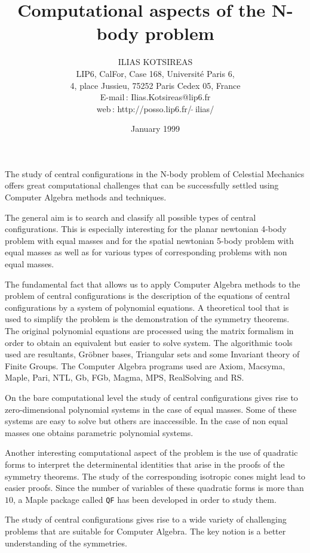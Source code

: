 
\textheight 24cm



\title{Computational aspects of the N-body problem }
\author{ 
ILIAS KOTSIREAS 
\\LIP6, CalFor, Case 168, Universit\'e Paris 6, 
\\4, place Jussieu, 75252 Paris Cedex 05, France
\\E-mail\,: Ilias.Kotsireas@lip6.fr
\\web\,: http://posso.lip6.fr/$ \ \tilde{\left. \right.} \ $ilias/}
\date{January 1999}
\maketitle

The study of central configurations 
in the N-body problem of Celestial Mechanics
offers great computational challenges
that can be successfully settled using 
Computer Algebra methods and techniques.  \par
The general aim is to search and classify
all possible types of central configurations.
This is especially interesting 
for the planar newtonian 4-body problem with equal masses and
for the spatial newtonian 5-body problem with equal masses
as well as for various types of corresponding problems 
with non equal masses. \par  
The fundamental fact that allows us to apply Computer Algebra methods to
the problem of central configurations is the description of
the equations of central configurations by a system of polynomial 
equations. A theoretical tool that is used to simplify 
the problem is the demonstration of the symmetry theorems.
The original polynomial equations are processed using the
matrix formalism in order to obtain an equivalent but easier
to solve system. The algorithmic tools used are resultants, Gr\"obner bases,
Triangular sets and some Invariant theory of Finite Groups.
The Computer Algebra programs used are Axiom, Macsyma, Maple, Pari,
NTL, Gb, FGb, Magma, MPS, RealSolving and RS. \par
On the bare computational level the study of central configurations
gives rise to zero-dimensional polynomial systems in the case of equal masses.
Some of these systems are easy to solve but others are inaccessible.
In the case of non equal masses one obtains parametric polynomial systems. \par
Another interesting computational aspect of the problem is the use of
quadratic forms to interpret the determinental identities that arise
in the proofs of the symmetry theorems. The study of the corresponding 
isotropic cones might lead to easier proofs. Since the number of
variables of these quadratic forms is more than $10$, 
a Maple package called {\tt QF} has been developed in order 
to study them. \par
The study of central configurations gives rise to a wide variety of
challenging problems that are suitable for Computer Algebra.
The key notion is a better understanding of the symmetries.   



